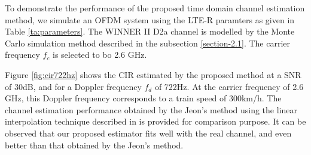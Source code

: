 \documentclass[AMA]{WileyNJD-v1}
\begin{document}
{{{To demonstrate the performance of the proposed time domain channel estimation method, we simulate an OFDM system using the LTE-R paramters as given in Table \ref{ta:parameters}. The  WINNER II D2a channel  is modelled by the Monte Carlo simulation method described in the subsection \ref{section-2.1}. The carrier frequency $f_c$ is selected to bo 2.6 GHz.

				
Figure \ref{fig:cir722hz} shows  the  CIR estimated by the proposed method at a SNR of  30dB, and for a Doppler frequency  $f_{d}$ of 722Hz. At the carrier frequency of 2.6 GHz, this Doppler frequency corresponds to a train speed of 300km/h. The channel estimation performance obtained by the Jeon's method using the linear interpolation technique described in \cite{Jeon1999} is provided for comparison purpose. It can be observed that our proposed estimator fits well with the real channel, and even better than that obtained by the  Jeon's method. 


}}}
\end{document}
